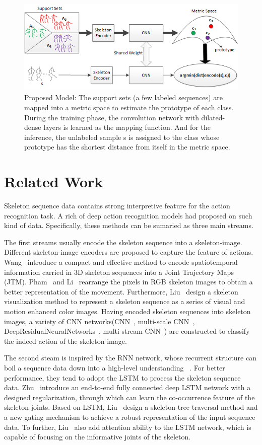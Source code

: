 \documentclass{bmvc2k}
\begin{document}
\begin{figure}[htb] 
	\centering
	\includegraphics[height=1.8in]{images/Figure_1.png}
	\caption{Proposed Model: The support sets (a few labeled sequences) are mapped into a metric space to estimate the prototype of each class. During the training phase, the convolution network with dilated-dense layers is learned as the mapping function. And for the inference, the unlabeled sample s is assigned to the class whose prototype has the shortest distance from itself in the metric space.}
	\label{fig:1}	
\end{figure}
\section{Related Work}
Skeleton sequence data contains strong interpretive feature for the action recognition task. A rich of deep action recognition models had proposed on such kind of data. Specifically, these methods can be sumaried as three main streams. 

The first streams usually encode the skeleton sequence into a skeleton-image. Different skeleton-image encoders are proposed to capture the feature of actions. Wang~\cite{wang2016action} introduce a compact and effective method to encode spatiotemporal information carried in 3D skeleton sequences into a Joint Trajectory Maps (JTM). Pham~\cite{pham2017learning} and Li~\cite{li2017skeleton} rearrange the pixels in RGB skeleton images to obtain a better representation of the movement. Furthermore, Liu~\cite{liu2017enhanced} design a skeleton visualization method to represent a skeleton sequence as a series of visual and motion enhanced color images. Having encoded skeleton sequences into skeleton images, a variety of CNN networks(CNN~\cite{wang2016action}, multi-scale CNN~\cite{li2017skeleton_2}, DeepResidualNeuralNetworks~\cite{pham2017learning}, multi-stream CNN~\cite{liu2017enhanced}) are constructed to classify the indeed action of the skeleton image. 

The second steam is inspired by the RNN network, whose recurrent structure can boil a sequence data down into a high-level understanding ~\cite{olah2016attention}. For better performance, they tend to adopt the LSTM to process the skeleton sequence data. Zhu~\cite{zhu2016co} introduce an end-to-end fully connected deep LSTM network with a designed regularization, through which can learn the co-occurrence feature of the skeleton joints. Based on LSTM, Liu~\cite{liu2018skeleton} design a skeleton tree traversal method and a new gating mechanism to achieve a robust representation of the input sequence data. To further, Liu~\cite{liu2018skeleton_13} also add attention ability to the LSTM network, which is capable of focusing on the informative joints of the skeleton.
\end{document}
